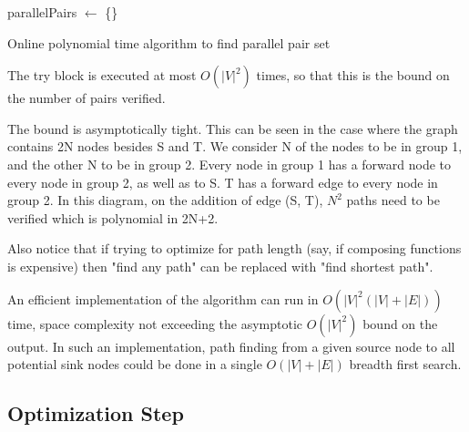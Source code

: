 \documentclass[sigplan,review,anonymous]{acmart}
\begin{document}
{\begin{algorithm}
parallelPairs $\gets$ \{\}\;
\;
\caption{Online polynomial time algorithm to find parallel pair set}
\label{algo_online_polynomial}
\end{algorithm}

The try block is executed at most $O(|V|^2)$ times, so that this is the bound on the number of pairs verified.

The bound is asymptotically tight. This can be seen in the case where the graph contains 2N nodes besides S and T. We consider N of the nodes to be in group 1, and the other N to be in group 2. Every node in group 1 has a forward node to every node in group 2, as well as to S. T has a forward edge to every node in group 2. In this diagram, on the addition of edge (S, T), $N^2$ paths need to be verified which is polynomial in 2N+2.

Also notice that if trying to optimize for path length (say, if composing functions is expensive) then "find any path" can be replaced with "find shortest path".

An efficient implementation of the algorithm can run in $O(|V|^2(|V|+|E|))$ time, space complexity not exceeding the asymptotic $O(|V|^2)$ bound on the output.
In such an implementation, path finding from a given source node to all potential sink nodes could be done in a single $O(|V|+|E|)$ breadth first search.

\subsection{Optimization Step}

}
\end{document}
